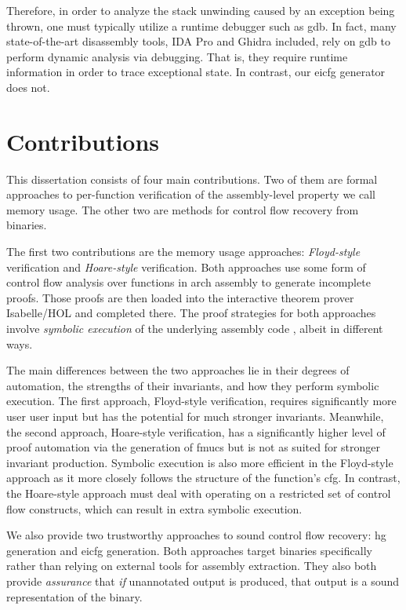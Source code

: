 Therefore, in order to analyze the stack unwinding caused by an exception being thrown, one must typically utilize a runtime debugger such as \ac{gdb}.
In fact, many state-of-the-art disassembly tools, IDA Pro and Ghidra included,
rely on \ac{gdb} to perform dynamic analysis via debugging.
That is, they require runtime information in order to trace exceptional state.
In contrast, our \ac{eicfg} generator does not.

\section{Contributions}
This dissertation consists of four main contributions.
Two of them are formal approaches to per-function verification of the assembly-level property we call memory usage.
The other two are methods for control flow recovery from binaries.

The first two contributions are the memory usage approaches: \emph{Floyd-style} verification and \emph{Hoare-style} verification.
Both approaches use some form of control flow analysis over functions in \gls{arch} assembly to generate incomplete proofs.
Those proofs are then loaded into the interactive theorem prover Isabelle/HOL%
 \autocite{nipkow2002isabelle}
and completed there.
The proof strategies for both approaches involve \emph{symbolic execution} of the underlying assembly code \autocite{king1976symbolic}, albeit in different ways.

The main differences between the two approaches lie in their degrees of automation, the strengths of their invariants, and how they perform symbolic execution.
The first approach, Floyd-style verification, requires significantly more user user input but has the potential for much stronger invariants.
Meanwhile, the second approach, Hoare-style verification, has a significantly higher level of proof automation via the generation of \acp{fmuc} but is not as suited for stronger invariant production.
Symbolic execution is also more efficient in the Floyd-style approach as it more closely follows the structure of the function's \ac{cfg}.
In contrast, the Hoare-style approach must deal with operating on a restricted set of control flow constructs, which can result in extra symbolic execution.

We also provide two trustworthy approaches to sound control flow recovery: \ac{hg} generation and \ac{eicfg} generation.
Both approaches target binaries specifically rather than relying on external tools for assembly extraction.
They also both provide \emph{assurance} that \emph{if} unannotated output is produced, that output is a sound representation of the binary.

